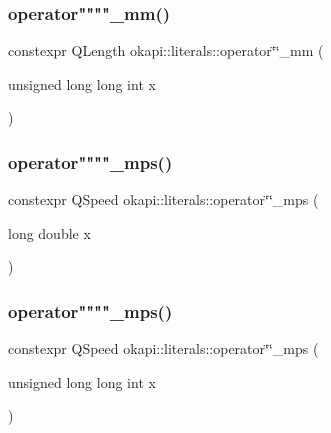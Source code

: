 \mbox{\label{namespaceokapi_1_1literals_a509f84df84a03f3a4fc1d5004d73ff05}} 
\subsubsection{\texorpdfstring{operator""""\_mm()}{operator""\_mm()}\hspace{0.1cm}{\footnotesize\ttfamily [2/2]}}
{\footnotesize\ttfamily constexpr Q\+Length okapi\+::literals\+::operator\char`\"{}\char`\"{}\+\_\+mm (\begin{DoxyParamCaption}\item[{unsigned long long int}]{x }\end{DoxyParamCaption})}

\mbox{\label{namespaceokapi_1_1literals_a22ab9532837f0c5ac3327e6acfbc0b54}} 
\subsubsection{\texorpdfstring{operator""""\_mps()}{operator""\_mps()}\hspace{0.1cm}{\footnotesize\ttfamily [1/2]}}
{\footnotesize\ttfamily constexpr Q\+Speed okapi\+::literals\+::operator\char`\"{}\char`\"{}\+\_\+mps (\begin{DoxyParamCaption}\item[{long double}]{x }\end{DoxyParamCaption})}

\mbox{\label{namespaceokapi_1_1literals_a9a35e99b1d8505b3aaf1b1d40fce5a48}} 
\subsubsection{\texorpdfstring{operator""""\_mps()}{operator""\_mps()}\hspace{0.1cm}{\footnotesize\ttfamily [2/2]}}
{\footnotesize\ttfamily constexpr Q\+Speed okapi\+::literals\+::operator\char`\"{}\char`\"{}\+\_\+mps (\begin{DoxyParamCaption}\item[{unsigned long long int}]{x }\end{DoxyParamCaption})}

